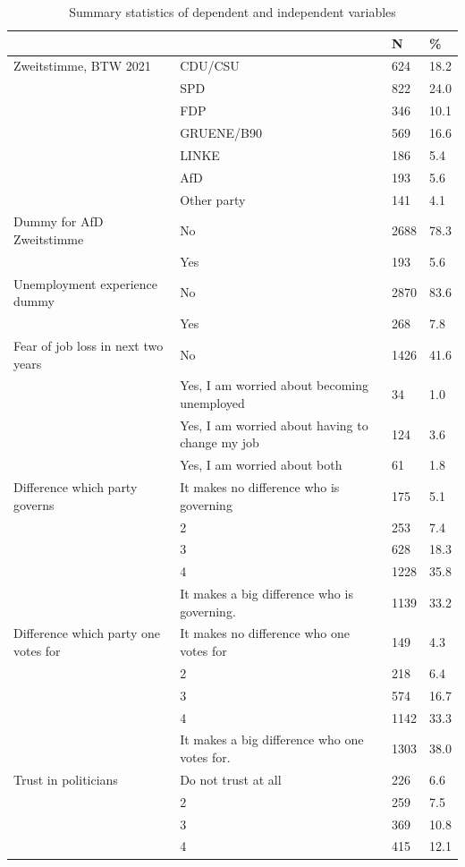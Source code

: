 \documentclass[
]{article}
\begin{document}
\begin{longtable}[t]{llll}
\caption{\label{tab:descriptive-statistics-for-variables-pruned}Summary statistics of dependent and independent variables}\\
\toprule
  &    & N & \%\\
\midrule
Zweitstimme, BTW 2021 & CDU/CSU & 624 & 18.2\\
 & SPD & 822 & 24.0\\
 & FDP & 346 & 10.1\\
 & GRUENE/B90 & 569 & 16.6\\
 & LINKE & 186 & 5.4\\
\addlinespace
 & AfD & 193 & 5.6\\
 & Other party & 141 & 4.1\\
Dummy for AfD Zweitstimme & No & 2688 & 78.3\\
 & Yes & 193 & 5.6\\
Unemployment experience dummy & No & 2870 & 83.6\\
\addlinespace
 & Yes & 268 & 7.8\\
Fear of job loss in next two years & No & 1426 & 41.6\\
 & Yes, I am worried about becoming unemployed & 34 & 1.0\\
 & Yes, I am worried about having to change my job & 124 & 3.6\\
 & Yes, I am worried about both & 61 & 1.8\\
\addlinespace
Difference which party governs & It makes no difference who is governing & 175 & 5.1\\
 & 2 & 253 & 7.4\\
 & 3 & 628 & 18.3\\
 & 4 & 1228 & 35.8\\
 & It makes a big difference who is governing. & 1139 & 33.2\\
\addlinespace
Difference which party one votes for & It makes no difference who one votes for & 149 & 4.3\\
 & 2 & 218 & 6.4\\
 & 3 & 574 & 16.7\\
 & 4 & 1142 & 33.3\\
 & It makes a big difference who one votes for. & 1303 & 38.0\\
\addlinespace
Trust in politicians & Do not trust at all & 226 & 6.6\\
 & 2 & 259 & 7.5\\
 & 3 & 369 & 10.8\\
 & 4 & 415 & 12.1\\

\end{longtable}
\end{document}
